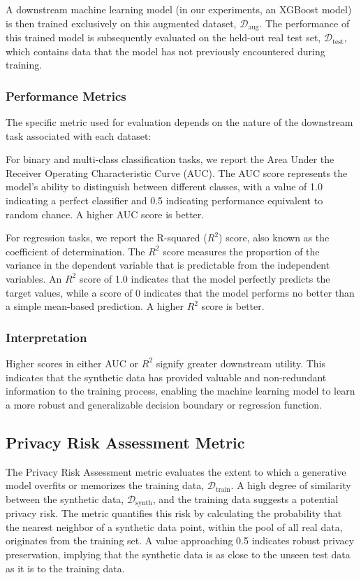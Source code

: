 A downstream machine learning model (in our experiments, an XGBoost model) is then trained exclusively on this augmented dataset, $\mathcal{D}_{\text{aug}}$. The performance of this trained model is subsequently evaluated on the held-out real test set, $\mathcal{D}_{\text{test}}$, which contains data that the model has not previously encountered during training.

\subsubsection{Performance Metrics}
The specific metric used for evaluation depends on the nature of the downstream task associated with each dataset:

For binary and multi-class classification tasks, we report the Area Under the Receiver Operating Characteristic Curve (AUC). The AUC score represents the model's ability to distinguish between different classes, with a value of 1.0 indicating a perfect classifier and 0.5 indicating performance equivalent to random chance. A higher AUC score is better.

For regression tasks, we report the R-squared ($R^2$) score, also known as the coefficient of determination. The $R^2$ score measures the proportion of the variance in the dependent variable that is predictable from the independent variables. An $R^2$ score of 1.0 indicates that the model perfectly predicts the target values, while a score of 0 indicates that the model performs no better than a simple mean-based prediction. A higher $R^2$ score is better.

\subsubsection{Interpretation}
Higher scores in either AUC or $R^2$ signify greater downstream utility. This indicates that the synthetic data has provided valuable and non-redundant information to the training process, enabling the machine learning model to learn a more robust and generalizable decision boundary or regression function.

\subsection{Privacy Risk Assessment Metric}
\label{app:privacy_metric}

The Privacy Risk Assessment metric evaluates the extent to which a generative model overfits or memorizes the training data, $\mathcal{D}_{\text{train}}$. A high degree of similarity between the synthetic data, $\mathcal{D}_{\text{synth}}$, and the training data suggests a potential privacy risk. The metric quantifies this risk by calculating the probability that the nearest neighbor of a synthetic data point, within the pool of all real data, originates from the training set. A value approaching 0.5 indicates robust privacy preservation, implying that the synthetic data is as close to the unseen test data as it is to the training data.

